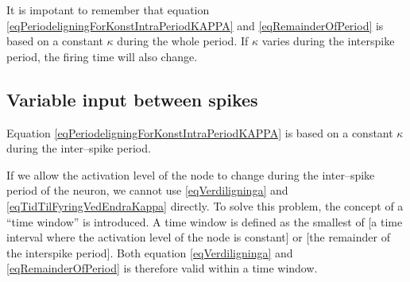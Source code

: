 It is impotant to remember that equation \eqref{eqPeriodeligningForKonstIntraPeriodKAPPA} and \eqref{eqRemainderOfPeriod} is based on a constant $\kappa$ during the whole period. 
If $\kappa$ varies during the interspike period, the firing time will also change. %





\subsection{Variable input between spikes}
\label{ssecVariableInputBetweenSpikes}
Equation \eqref{eqPeriodeligningForKonstIntraPeriodKAPPA} is based on a constant $\kappa$ during the inter--spike period.


If we allow the activation level of the node to change during the inter--spike period of the neuron, we cannot use \eqref{eqVerdiligninga} and \eqref{eqTidTilFyringVedEndraKappa} directly.
To solve this problem, the concept of a ``time window'' is introduced. A time window is defined as the smallest of [a time interval where the activation level of the node is constant] or [the remainder of the interspike period].
Both equation \eqref{eqVerdiligninga} and \eqref{eqRemainderOfPeriod} is therefore valid within a time window.

